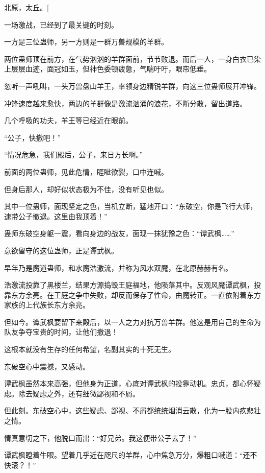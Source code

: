 
\begin{this_body}

北原，太丘。[

一场激战，已经到了最关键的时刻。

一方是三位蛊师，另一方则是一群万兽规模的羊群。

两位蛊师顶在前方，在气势汹汹的羊群面前，节节败退。而后一人，一身白衣已染上层层血迹，面冠如玉，但神色委顿疲惫，气喘吁吁，眼帘低垂。

忽听一声吼叫，一头万兽盘山羊王，率领身边精锐羊群，向这三位蛊师展开冲锋。

冲锋速度越来愈快，两边的羊群像是激流汹涌的浪花，不断分散，留出道路。

几个呼吸的功夫，羊王等已经近在眼前。

“公子，快撤吧！”

“情况危急，我们殿后，公子，来日方长啊。”

前面的两位蛊师，见此危情，睚眦欲裂，口中连喊。

但身后那人，却好似状态极为不佳，没有听见也似。

其中一位蛊师，面现坚定之色，当机立断，猛地开口：“东破空，你是飞行大师，速带公子撤退。这里由我顶着！”

蛊师东破空身躯一震，看向身边的战友，面现一抹犹豫之色：“谭武枫……”

意欲留守的这位蛊师，正是谭武枫。

早年乃是魔道蛊师，和水魔浩激流，并称为风水双魔，在北原赫赫有名。

浩激流投靠了黑楼兰，结果方源捣毁王庭福地，他陨落其中。反观风魔谭武枫，投靠东方余亮。在王庭之争中失败，却反而保存了性命，由魔转正。一直依附着东方家族的上代族长东方余亮。

但如今。谭武枫要留下来殿后，以一人之力对抗万兽羊群。他这是用自己的生命为队友争夺宝贵的时间，让他们撤退！

这根本就没有生存的任何希望，名副其实的十死无生。

东破空心中震撼，又感动。

谭武枫虽然本来高强，但他身为正道，心底对谭武枫的投靠动机。忠贞，都心怀疑虑。除去疑虑之外，还有细微鄙视和不屑。

但此刻。东破空心中，这些疑虑、鄙视、不屑都统统烟消云散，化为一股内疚悲壮之情。

情真意切之下，他脱口而出：“好兄弟。我这便带公子去了！”

谭武枫瞪着牛眼。望着几乎近在咫尺的羊群，心中焦急万分，爆粗口喊道：“还不快滚？！”


\end{this_body}
